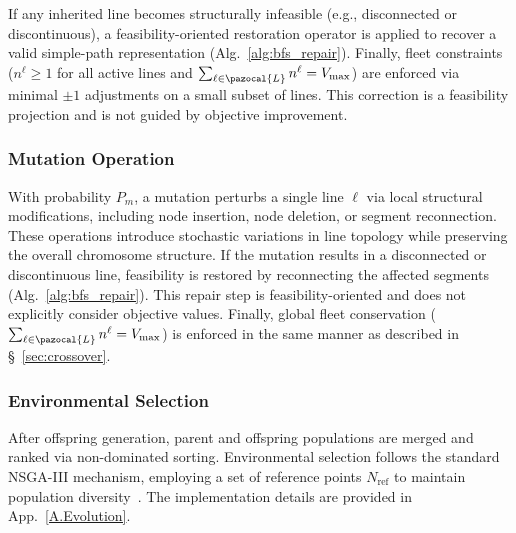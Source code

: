 \documentclass[a4paper,fleqn]{cas-sc}
\begin{document}
If any inherited line becomes structurally infeasible (e.g., disconnected or discontinuous), a feasibility-oriented restoration operator is applied to recover a valid simple-path representation (Alg.~\ref{alg:bfs_repair}).
%
Finally, fleet constraints ($n^\ell \ge 1$ for all active lines and $\sum_{\ell\in\pazocal{L}} n^\ell = V_{\max}$) are enforced via minimal $\pm 1$ adjustments on a small subset of lines.
This correction is a feasibility projection and is not guided by objective improvement.
\subsubsection{Mutation Operation}\label{sec:mutation}

With probability $P_m$, a mutation perturbs a single line $\ell$ via local structural modifications, including node insertion, node deletion, or segment reconnection.
These operations introduce stochastic variations in line topology while preserving the overall chromosome structure.
%
If the mutation results in a disconnected or discontinuous line,
feasibility is restored by reconnecting the affected segments (Alg.~\ref{alg:bfs_repair}).
This repair step is feasibility-oriented and does not explicitly consider objective values.
%
Finally, global fleet conservation ($\sum_{\ell\in\pazocal{L}} n^\ell = V_{\max}$)
is enforced in the same manner as described in \S~\ref{sec:crossover}.

\subsubsection{Environmental Selection}\label{sec:env_selection}
After offspring generation, parent and offspring populations are merged and ranked via non-dominated sorting.
%
Environmental selection follows the standard NSGA-III mechanism, employing a set of reference points $N_\text{ref}$ to maintain population diversity~\citep{deb2014nsga3}. The implementation details are provided in App.~\ref{A.Evolution}.
\end{document}
